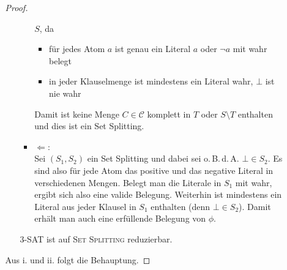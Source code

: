 \documentclass[a4paper]{scrartcl}
\begin{document}
\begin{enumerate}[label=\bfseries \arabic*.]
\begin{enumerate}
\begin{proof}
\begin{enumerate}
\begin{itemize}
                            $S$, da
                            \begin{itemize}
                                \item
                                    für jedes Atom $a$ ist genau ein Literal
                                    $a$ oder $\lnot a$ mit wahr belegt
                                \item
                                    in jeder Klauselmenge ist mindestens ein
                                    Literal wahr, $\bot$ ist nie wahr
                            \end{itemize}
                            Damit ist keine Menge $C \in \mathcal{C}$ komplett
                            in $T$ oder $S \setminus T$ enthalten und dies ist
                            ein Set Splitting.

                        \item $\Leftarrow$: \\
                            Sei $(S_1,S_2)$ ein Set Splitting und dabei sei
                            o.\,B.\,d.\,A. $\bot \in S_2$.
                            Es sind also für jede Atom das positive und das
                            negative Literal in verschiedenen Mengen.
                            Belegt man die Literale in $S_1$ mit wahr, ergibt
                            sich also eine valide Belegung.
                            Weiterhin ist mindestens ein Literal aus jeder
                            Klausel in $S_1$ enthalten (denn $\bot \in S_2$).
                            Damit erhält man auch eine erfüllende Belegung von
                            $\phi$.
                    \end{itemize}
                    3-SAT ist auf \textsc{Set Splitting} reduzierbar.
            \end{enumerate}
            Aus i. und ii. folgt die Behauptung.
        \end{proof}


\end{enumerate}
\end{enumerate}
\end{document}
